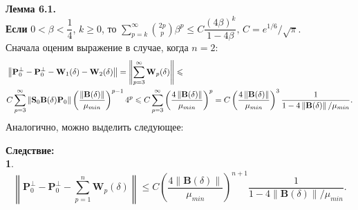 \documentclass[fleqn]{article}
\newcommand\norm[1]{\left\|#1\right\|}
\renewcommand\b[1]{\mathbf{#1}}
\newtheorem{corollary}{Следствие:\\}
\begin{document}
	\textbf{Лемма 6.1.}\\ \textbf{Если} $0<\beta<\dfrac{1}{4}$, $k \geqslant 0$, то 
	$\sum^\infty_{p=k}{2p \choose p}\beta^p \leqslant C\dfrac{(4\beta)^k}{1-4\beta},\,C = e^{1/6}/\sqrt{\pi}$.\\
	Сначала оценим выражение в случае, когда $n=2$:
	\begin{align}\notag
		&\norm{\b{P}_0^\bot - \b{P}_0^\bot - \b{W}_1(\delta) - \b{W}_2(\delta)} = \norm{\sum^\infty_{p=3}\b{W}_p(\delta)}\leqslant\\\label{eq:m_1}
		&C\sum^\infty_{p=3}\norm{\b{S}_0\b{B}(\delta)\b{P}_0}\left(\dfrac{\norm{\b{B}(\delta)}}{\mu_{min}}\right)^{p-1}4^p\leqslant C\sum^\infty_{p=3}\left(\dfrac{4\norm{\b{B}(\delta)}}{\mu_{min}}\right)^p = C\left(\dfrac{4\norm{\b{B}(\delta)}}{\mu_{min}}\right)^3\dfrac{1}{1-4\norm{\b{B}(\delta)}/\mu_{min}}.
	\end{align}
	Аналогично, можно выделить следующее:
	\begin{corollary}
	\begin{equation}\label{eq:m_2}
		\norm{\b{P}_0^\bot - \b{P}_0^\bot - \sum\limits^n_{p=1}\b{W}_p(\delta)} \leqslant C\left(\dfrac{4\norm{\b{B}(\delta)}}{\mu_{min}}\right)^{n+1}\dfrac{1}{1-4\norm{\b{B}(\delta)}/\mu_{min}}.
	\end{equation}
	\end{corollary}
	
\end{document}
